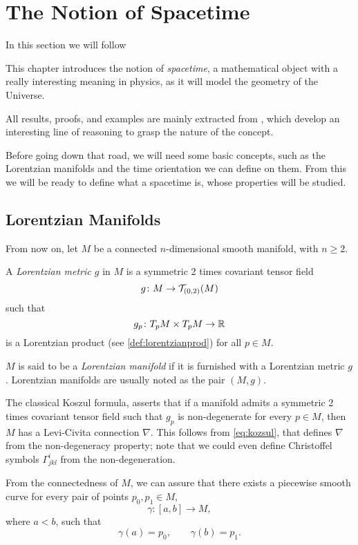 \chapter{The Notion of Spacetime}

In this section we will follow \cite{romero10}

This chapter introduces the notion of \emph{spacetime}, a mathematical object with a really interesting meaning in physics, as it will model the geometry of the Universe.

All results, proofs, and examples are mainly extracted from \cite{romero10}, which develop an interesting line of reasoning to grasp the nature of the concept.

Before going down that road, we will need some basic concepts, such as the Lorentzian manifolds and the time orientation we can define on them. From this we will be ready to define what a spacetime is, whose properties will be studied.

\section{Lorentzian Manifolds}

From now on, let $M$ be a connected $n$-dimensional smooth manifold, with $n\geq2$.

\begin{definition}
	A \emph{Lorentzian metric $g$} in $M$ is a symmetric 2 times covariant tensor field
	\[
		g \colon M \to {\mathcal T}_{(0,2)}(M)
	\]
	such that
	\[
		g_p \colon T_pM \times T_pM \to \mathbb{R}
	\]
	is a Lorentzian product (see \autoref{def:lorentzianprod}) for all $p \in M$.
\end{definition}

\begin{definition}
	$M$ is said to be a \emph{Lorentzian manifold} if it is furnished with a Lorentzian metric $g$. Lorentzian manifolds are usually noted as the pair $(M,g)$.
\end{definition}

The classical Koszul formula, asserts that if a manifold admits a symmetric 2 times covariant tensor field such that $g_p$ is non-degenerate for every $p \in M$, then $M$ has a Levi-Civita connection $\nabla$.  This follows from \autoref{eq:kozsul}, that defines $\nabla$ from the non-degeneracy property; note that we could even define Christoffel symbols $\Gamma^i_{jkl}$ from the non-degeneration.

From the connectedness of $M$, we can assure that there exists a piecewise smooth curve for every pair of points $p_0, p_1 \in M$,
\[
	\gamma \colon [a,b] \to M,
\]
where $a < b$, such that
\[
	\gamma(a) = p_0, \qquad \gamma(b) = p_1.
\]

